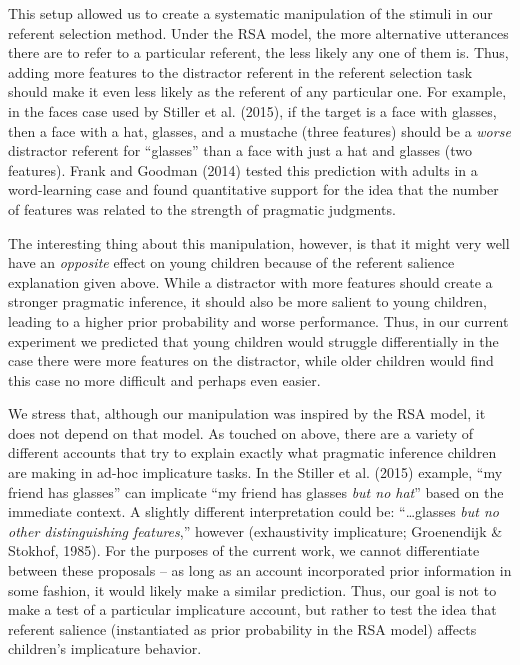 \documentclass[man]{apa6}
\begin{document}
This setup allowed us to create a systematic manipulation of the stimuli
in our referent selection method. Under the RSA model, the more
alternative utterances there are to refer to a particular referent, the
less likely any one of them is. Thus, adding more features to the
distractor referent in the referent selection task should make it even
less likely as the referent of any particular one. For example, in the
faces case used by Stiller et al. (2015), if the target is a face with
glasses, then a face with a hat, glasses, and a mustache (three
features) should be a \emph{worse} distractor referent for
\enquote{glasses} than a face with just a hat and glasses (two
features). Frank and Goodman (2014) tested this prediction with adults
in a word-learning case and found quantitative support for the idea that
the number of features was related to the strength of pragmatic
judgments.

The interesting thing about this manipulation, however, is that it might
very well have an \emph{opposite} effect on young children because of
the referent salience explanation given above. While a distractor with
more features should create a stronger pragmatic inference, it should
also be more salient to young children, leading to a higher prior
probability and worse performance. Thus, in our current experiment we
predicted that young children would struggle differentially in the case
there were more features on the distractor, while older children would
find this case no more difficult and perhaps even easier.

We stress that, although our manipulation was inspired by the RSA model,
it does not depend on that model. As touched on above, there are a
variety of different accounts that try to explain exactly what pragmatic
inference children are making in ad-hoc implicature tasks. In the
Stiller et al. (2015) example, \enquote{my friend has glasses} can
implicate \enquote{my friend has glasses \emph{but no hat}} based on the
immediate context. A slightly different interpretation could be:
\enquote{\ldots{}glasses \emph{but no other distinguishing features},}
however (exhaustivity implicature; Groenendijk \& Stokhof, 1985). For
the purposes of the current work, we cannot differentiate between these
proposals -- as long as an account incorporated prior information in
some fashion, it would likely make a similar prediction. Thus, our goal
is not to make a test of a particular implicature account, but rather to
test the idea that referent salience (instantiated as prior probability
in the RSA model) affects children's implicature behavior.
\end{document}

